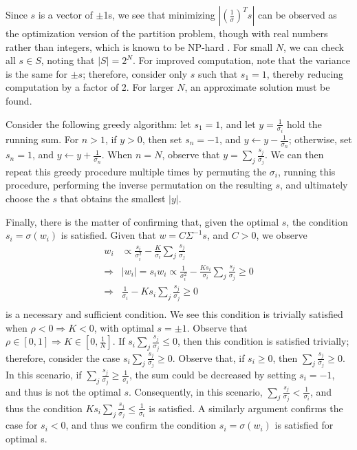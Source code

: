 \documentclass[10pt,twoside,titlepage]{article}   %
\begin{document}
Since $s$ is a vector of $\pm$1s, we see that minimizing $| \left( \frac{1}{\sigma} \right)^T s |$ 
can be observed as the optimization version of the partition problem, though with real numbers rather than integers, 
which is known to be NP-hard \cite{NPComplete}. 
For small $N$, we can check all $s \in S$, noting that $|S|=2^N$. 
For improved computation, note that the variance is the same for $\pm s$; 
therefore, consider only $s$ such that $s_1=1$, 
thereby reducing computation by a factor of 2. 
For larger $N$, an approximate solution must be found.

Consider the following greedy algorithm: let $s_1=1$, 
and let $y= \frac{1}{\sigma_i}$ hold the running sum. 
For $n > 1$, if $y>0$, then set $s_n = -1$, 
and $ y \leftarrow y - \frac{1}{\sigma_n}$; 
otherwise, set $s_n=1$, and $y \leftarrow y + \frac{1}{\sigma_n}$. 
When $n=N$, observe that $y=\sum_j \frac{ s_j }{ \sigma_j }$. 
We can then repeat this greedy procedure multiple times by permuting 
the $\sigma_i$, running this procedure, performing the inverse permutation 
on the resulting $s$, and ultimately choose the $s$ that obtains 
the smallest $|y|$.

Finally, there is the matter of confirming that, given the optimal $s$, 
the condition $s_i =  \sigma(w_i)$ is satisfied. 
Given that $w = C\Sigma^{-1}s$, and $C>0$, we observe
\begin{equation*}
\begin{aligned}
w_i &\propto \frac{ s_i }{ \sigma_i^2 } - \frac{ K }{ \sigma_i } \sum_j \frac{ s_j }{ \sigma_j } \\
\Rightarrow & | w_i | = s_i w_i \propto \frac{ 1 }{ \sigma_i^2 } - \frac{ K s_i }{ \sigma_i } \sum_j \frac{ s_j }{ \sigma_j } \geq 0 \\
\Rightarrow & \frac{ 1 }{ \sigma_i } - K s_i \sum_j \frac{ s_j }{ \sigma_j } \geq 0 \\
\end{aligned}
\end{equation*}
is a necessary and sufficient condition. We see this condition is 
trivially satisfied when $\rho < 0 \Rightarrow K<0$, 
with optimal $s=\pm 1$. 
Observe that $\rho \in [0,1] \Rightarrow K \in \left[ 0,\frac{1}{N} \right]$. 
If $s_i \sum_j \frac{s_j}{ \sigma_j} \leq 0$, 
then this condition is satisfied trivially; 
therefore, consider the case $s_i \sum_j \frac{ s_j }{ \sigma_j} \geq 0$.
Observe that, if $s_i \geq 0$, then $\sum_j \frac{s_j}{ \sigma_j} \geq 0$.
In this scenario, if $\sum_j \frac{s_j}{ \sigma_j} \geq \frac{1}{\sigma_i}$,
the sum could be decreased by setting $s_i=-1$, 
and thus is not the optimal $s$. 
Consequently, in this scenario, $\sum_j \frac{s_j}{ \sigma_j} < \frac{1}{\sigma_i}$, 
and thus the condition $K s_i \sum_j \frac{s_j}{\sigma_j} \leq \frac{1}{\sigma_i}$ is satisfied. 
A similarly argument confirms the case for $s_i<0$, and thus we confirm the condition 
$s_i=\sigma(w_i)$ is satisfied for optimal s.
\end{document}
